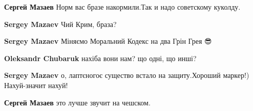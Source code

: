 \begin{itemize}
\begin{itemize}
\textbf{Сергей Мазаев} Норм вас бразе накормили.Так и надо советскому куколду.

 
\textbf{Sergey Mazaev} Чий Крим, браза?

 
\textbf{Sergey Mazaev} Міняємо Моральний Кодекс на два Грін Грея 😎\Laughey[1.0][white]

\begin{itemize}
 
\textbf{Oleksandr Chubaruk} нахіба вони нам? що одні, що инші?
\end{itemize}


\end{itemize}

 
\textbf{Sergey Mazaev} о, лаптєногоє существо встало на защиту.Хороший маркер!) Нахуй-значит нахуй!

 
\textbf{Сергей Мазаев} это лучше звучит на чешском.

 

\end{itemize}
